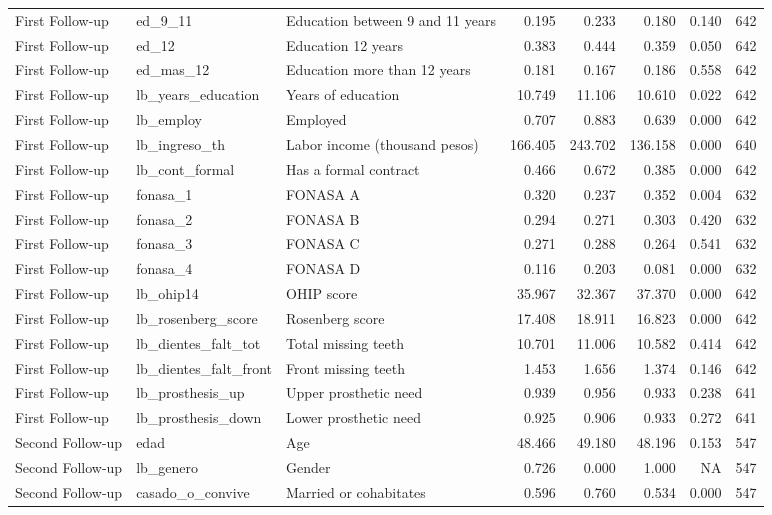 \begin{table}
\begin{tabular}[t]{lllrrrrr}
First Follow-up & ed\_9\_11 & Education between 9 and 11 years & 0.195 & 0.233 & 0.180 & 0.140 & 642\\
First Follow-up & ed\_12 & Education 12 years & 0.383 & 0.444 & 0.359 & 0.050 & 642\\
First Follow-up & ed\_mas\_12 & Education more than 12 years & 0.181 & 0.167 & 0.186 & 0.558 & 642\\
\addlinespace
First Follow-up & lb\_years\_education & Years of education & 10.749 & 11.106 & 10.610 & 0.022 & 642\\
First Follow-up & lb\_employ & Employed & 0.707 & 0.883 & 0.639 & 0.000 & 642\\
First Follow-up & lb\_ingreso\_th & Labor income (thousand pesos) & 166.405 & 243.702 & 136.158 & 0.000 & 640\\
First Follow-up & lb\_cont\_formal & Has a formal contract & 0.466 & 0.672 & 0.385 & 0.000 & 642\\
First Follow-up & fonasa\_1 & FONASA A & 0.320 & 0.237 & 0.352 & 0.004 & 632\\
\addlinespace
First Follow-up & fonasa\_2 & FONASA B & 0.294 & 0.271 & 0.303 & 0.420 & 632\\
First Follow-up & fonasa\_3 & FONASA C & 0.271 & 0.288 & 0.264 & 0.541 & 632\\
First Follow-up & fonasa\_4 & FONASA D & 0.116 & 0.203 & 0.081 & 0.000 & 632\\
First Follow-up & lb\_ohip14 & OHIP score & 35.967 & 32.367 & 37.370 & 0.000 & 642\\
First Follow-up & lb\_rosenberg\_score & Rosenberg score & 17.408 & 18.911 & 16.823 & 0.000 & 642\\
\addlinespace
First Follow-up & lb\_dientes\_falt\_tot & Total missing teeth & 10.701 & 11.006 & 10.582 & 0.414 & 642\\
First Follow-up & lb\_dientes\_falt\_front & Front missing teeth & 1.453 & 1.656 & 1.374 & 0.146 & 642\\
First Follow-up & lb\_prosthesis\_up & Upper prosthetic need & 0.939 & 0.956 & 0.933 & 0.238 & 641\\
First Follow-up & lb\_prosthesis\_down & Lower prosthetic need & 0.925 & 0.906 & 0.933 & 0.272 & 641\\
Second Follow-up & edad & Age & 48.466 & 49.180 & 48.196 & 0.153 & 547\\
\addlinespace
Second Follow-up & lb\_genero & Gender & 0.726 & 0.000 & 1.000 & NA & 547\\
Second Follow-up & casado\_o\_convive & Married or cohabitates & 0.596 & 0.760 & 0.534 & 0.000 & 547\\

\end{tabular}
\end{table}
